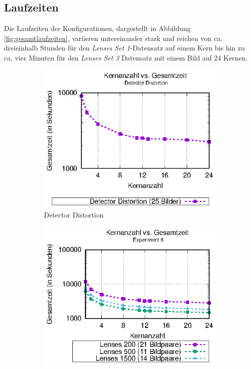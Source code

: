 \subsection{Laufzeiten}

Die Laufzeiten der Konfigurationen, dargestellt in Abbildung \ref{fig:gesamtlaufzeiten}, variieren untereinander stark und reichen von ca. dreieinhalb Stunden für den \textit{Lenses Set 1}-Datensatz auf einem Kern bis hin zu ca. vier Minuten für den \textit{Lenses Set 3} Datensatz mit einem Bild auf 24 Kernen.

\begin{center}
	\begin{figure}[htbp]
		\begin{subfigure}[b]{0.325\textwidth}
			\centering
			\includegraphics[width=\textwidth]{pdf/times_detector_distortion}
			\caption[Detector Distortion]{Detector Distortion}
			\label{fig:times_det_dist}
		\end{subfigure}
		\hfill
		\begin{subfigure}[b]{0.325\textwidth}
			\centering
			\includegraphics[width=\textwidth]{pdf/times_exp6}

\end{subfigure}
\end{figure}
\end{center}
